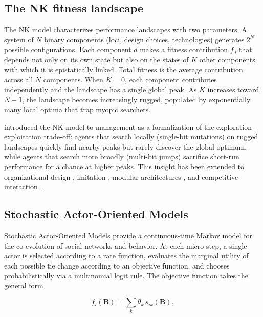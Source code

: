 \documentclass[
  article]{jss}
\begin{document}
\subsection{The NK fitness landscape}\label{the-nk-fitness-landscape}

The NK model \citep{Kauffman1987, KauffmanWeinberger1989} characterizes
performance landscapes with two parameters. A system of \(N\) binary
components (loci, design choices, technologies) generates \(2^N\)
possible configurations. Each component \(d\) makes a fitness
contribution \(f_d\) that depends not only on its own state but also on
the states of \(K\) other components with which it is epistatically
linked. Total fitness is the average contribution across all \(N\)
components. When \(K = 0\), each component contributes independently and
the landscape has a single global peak. As \(K\) increases toward
\(N - 1\), the landscape becomes increasingly rugged, populated by
exponentially many local optima that trap myopic searchers.

\citet{Levinthal1997} introduced the NK model to management as a
formalization of the exploration--exploitation trade-off: agents that
search locally (single-bit mutations) on rugged landscapes quickly find
nearby peaks but rarely discover the global optimum, while agents that
search more broadly (multi-bit jumps) sacrifice short-run performance
for a chance at higher peaks. This insight has been extended to
organizational design \citep{SiggelkowRivkin2005}, imitation
\citep{Rivkin2000}, modular architectures \citep{EthirajLevinthal2004},
and competitive interaction \citep{Lenox2006}.

\subsection{Stochastic Actor-Oriented
Models}\label{stochastic-actor-oriented-models}

Stochastic Actor-Oriented Models \citep{Snijders1996,
SnijdersVdBuntSteglich2010} provide a continuous-time Markov model for
the co-evolution of social networks and behavior. At each micro-step, a
single actor is selected according to a rate function, evaluates the
marginal utility of each possible tie change according to an objective
function, and chooses probabilistically via a multinomial logit rule.
The objective function takes the general form

\begin{equation}\label{eq:saom-objective}
  f_i(\mathbf{B}) = \sum_k \theta_k \, s_{ik}(\mathbf{B}),
\end{equation}
\end{document}
